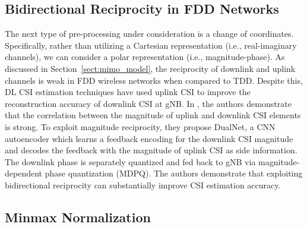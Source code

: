 
\subsection{Bidirectional Reciprocity in FDD Networks}

The next type of pre-processing under consideration is a change of coordinates. Specifically, rather than utilizing a Cartesian representation (i.e., real-imaginary channels), we can consider a polar representation (i.e., magnitude-phase). As discussed in Section~\ref{sect:mimo_model}, the reciprocity of downlink and uplink channels is weak in FDD wireless networks when compared to TDD. Despite this, DL CSI estimation techniques have used uplink CSI to improve the reconstruction accuracy of downlink CSI at gNB. In \cite{ref:dualnet}, the authors demonstrate that the correlation between the magnitude of uplink and downlink CSI elements is strong. To exploit magnitude reciprocity, they propose DualNet, a CNN autoencoder which learns a feedback encoding for the downlink CSI magnitude and decodes the feedback with the magnitude of uplink CSI as side information. The downlink phase is separately quantized and fed back to gNB via magnitude-dependent phase quantization (MDPQ). The authors demonstrate that exploiting bidirectional reciprocity can substantially improve CSI estimation accuracy.

\subsection{Minmax Normalization}

